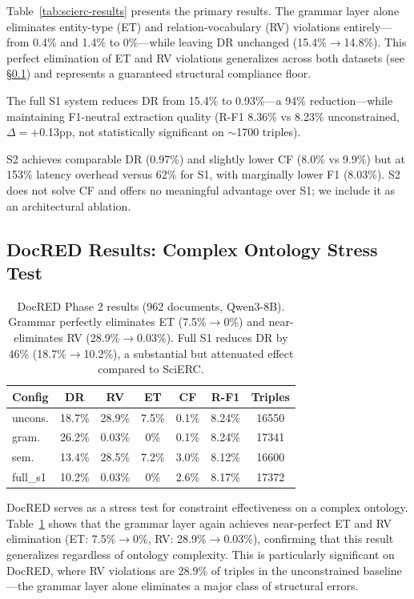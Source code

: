 \documentclass[11pt,a4paper]{article}
\begin{document}
Table~\ref{tab:scierc-results} presents the primary results.
The grammar layer alone eliminates entity-type (ET) and relation-vocabulary (RV) violations entirely---from 0.4\% and 1.4\% to 0\%---while leaving DR unchanged (15.4\%$\to$14.8\%).
This perfect elimination of ET and RV violations generalizes across both datasets (see \S\ref{sec:docred}) and represents a guaranteed structural compliance floor.

The full S1 system reduces DR from 15.4\% to 0.93\%---a 94\% reduction---while maintaining F1-neutral extraction quality (R-F1 8.36\% vs 8.23\% unconstrained, $\Delta{=}$+0.13pp, not statistically significant on $\sim$1700 triples).

S2 achieves comparable DR (0.97\%) and slightly lower CF (8.0\% vs 9.9\%) but at 153\% latency overhead versus 62\% for S1, with marginally lower F1 (8.03\%).
S2 does not solve CF and offers no meaningful advantage over S1; we include it as an architectural ablation.

\subsection{DocRED Results: Complex Ontology Stress Test}
\label{sec:docred}

\begin{table}[t]
\centering
\small
\begin{tabular}{lcccccc}
\toprule
\textbf{Config} & \textbf{DR} & \textbf{RV} & \textbf{ET} & \textbf{CF} & \textbf{R-F1} & \textbf{Triples} \\
\midrule
uncons. & 18.7\% & 28.9\% & 7.5\% & 0.1\% & 8.24\% & 16550 \\
gram. & 26.2\% & 0.03\% & 0\% & 0.1\% & 8.24\% & 17341 \\
sem. & 13.4\% & 28.5\% & 7.2\% & 3.0\% & 8.12\% & 16600 \\
full\_s1 & 10.2\% & 0.03\% & 0\% & 2.6\% & 8.17\% & 17372 \\
\bottomrule
\end{tabular}
\caption{DocRED Phase 2 results (962 documents, Qwen3-8B). Grammar perfectly eliminates ET (7.5\%$\to$0\%) and near-eliminates RV (28.9\%$\to$0.03\%). Full S1 reduces DR by 46\% (18.7\%$\to$10.2\%), a substantial but attenuated effect compared to SciERC.}
\label{tab:docred-results}
\end{table}

DocRED serves as a stress test for constraint effectiveness on a complex ontology.
Table~\ref{tab:docred-results} shows that the grammar layer again achieves near-perfect ET and RV elimination (ET: 7.5\%$\to$0\%, RV: 28.9\%$\to$0.03\%), confirming that this result generalizes regardless of ontology complexity.
This is particularly significant on DocRED, where RV violations are 28.9\% of triples in the unconstrained baseline---the grammar layer alone eliminates a major class of structural errors.
\end{document}
